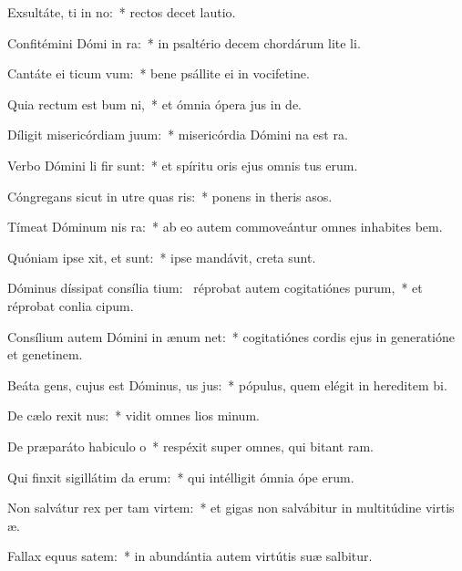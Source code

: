 \item Exsultáte, ti in no:~* rectos decet lautio.
\item Confitémini Dómi in ra:~* in psaltério decem chordárum lite li.
\item Cantáte ei ticum vum:~* bene psállite ei in vocifetine.
\item Quia rectum est bum ni,~* et ómnia ópera jus in de.
\item Díligit misericórdiam  juum:~* misericórdia Dómini na est ra.
\item Verbo Dómini li fir sunt:~* et spíritu oris ejus omnis tus erum.
\item Cóngregans sicut in utre quas ris:~* ponens in theris asos.
\item Tímeat Dóminum nis ra:~* ab eo autem commoveántur omnes inhabites bem.
\item Quóniam ipse xit, et  sunt:~* ipse mandávit,  creta sunt.
\item Dóminus díssipat consília tium:~\pscross{} réprobat autem cogitatiónes purum,~* et réprobat conlia cipum.
\item Consílium autem Dómini in ænum net:~* cogitatiónes cordis ejus in generatióne et genetinem.
\item Beáta gens, cujus est Dóminus, us jus:~* pópulus, quem elégit in hereditem bi.
\item De cælo rexit nus:~* vidit omnes lios minum.
\item De præparáto habiculo o~* respéxit super omnes, qui bitant ram.
\item Qui finxit sigillátim da erum:~* qui intélligit ómnia ópe erum.
\item Non salvátur rex per tam virtem:~* et gigas non salvábitur in multitúdine virtis æ.
\item Fallax equus  satem:~* in abundántia autem virtútis suæ  salbitur.
